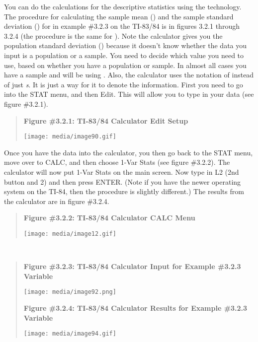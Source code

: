 \documentclass[]{book}
\begin{document}
You can do the calculations for the descriptive statistics using the
technology. The procedure for calculating the sample mean () and the
sample standard deviation () for in example \#3.2.3 on the TI-83/84 is
in figures 3.2.1 through 3.2.4 (the procedure is the same for ). Note
the calculator gives you the population standard deviation () because it
doesn't know whether the data you input is a population or a sample. You
need to decide which value you need to use, based on whether you have a
population or sample. In almost all cases you have a sample and will be
using . Also, the calculator uses the notation of instead of just \emph{s}.
It is just a way for it to denote the information. First you need to go
into the STAT menu, and then Edit. This will allow you to type in your
data (see figure \#3.2.1).

\begin{quote}
\textbf{Figure \#3.2.1: TI-83/84 Calculator Edit Setup}

\texttt{[image: media/image90.gif]}
\end{quote}

Once you have the data into the calculator, you then go back to the STAT
menu, move over to CALC, and then choose 1-Var Stats (see figure
\#3.2.2). The calculator will now put 1-Var Stats on the main screen.
Now type in L2 (2nd button and 2) and then press ENTER. (Note if you
have the newer operating system on the TI-84, then the procedure is
slightly different.) The results from the calculator are in figure
\#3.2.4.

\begin{quote}
\textbf{Figure \#3.2.2: TI-83/84 Calculator CALC Menu}

\texttt{[image: media/image12.gif]}
\end{quote}

\textbf{\\
}

\begin{quote}
\textbf{Figure \#3.2.3: TI-83/84 Calculator Input for Example \#3.2.3
Variable }

\texttt{[image: media/image92.png]}

\textbf{Figure \#3.2.4: TI-83/84 Calculator Results for Example \#3.2.3
Variable }

\texttt{[image: media/image94.gif]}
\end{quote}
\end{document}
